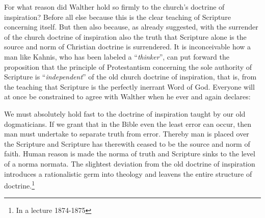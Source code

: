                 For what reason did Walther hold so firmly to the church’s doctrine of inspiration?  Before all else because this is the clear teaching of Scripture concerning itself.  But then also because, as already suggested, with the surrender of the church doctrine of inspiration also the truth that Scripture alone is the source and norm of Christian doctrine is surrendered.  It is inconceivable how a man like Kahnis, who has been labeled a “\textit{thinker}”, can put forward the proposition that the principle of Protestantism concerning the sole authority of Scripture is “\textit{independent}” of the old church doctrine of inspiration, that is, from the teaching that Scripture is the perfectly inerrant Word of God.  Everyone will at once be constrained to agree with Walther when he ever and again declares: \begin{fancyquotes}We must absolutely hold fast to the doctrine of inspiration taught by our old dogmaticians.  If we grant that in the Bible even the least error can occur, then man must undertake to separate truth from error.  Thereby man is placed over the Scripture and Scripture has therewith ceased to be the source and norm of faith.  Human reason is made the norma of truth and Scripture sinks to the level of a norma normata.  The slightest deviation from the old doctrine of inspiration introduces a rationalistic germ into theology and leavens the entire structure of doctrine.\footnote{In a lecture 1874-1875}\end{fancyquotes}

